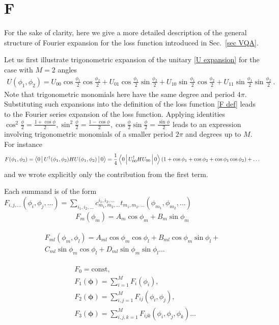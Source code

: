 \documentclass[twocolumn, amsfonts, amssymb, aps, nofootinbib]{revtex4-2}
\begin{document}
\onecolumngrid


\appendix
\section{F} \label{app explicit}
For the sake of clarity, here we give a more detailed description of the general structure of Fourier expansion for the loss function introduced in Sec.~\ref{sec VQA}.

Let us first illustrate trigonometric expansion of the unitary \eqref{U expansion} for the case with $M=2$ angles
\begin{align}
	U(\phi_1,\phi_2) = U_{00}\cos\frac{\phi_1}{2}\cos\frac{\phi_2}{2}+U_{01}\cos\frac{\phi_1}{2}\sin\frac{\phi_2}{2}+U_{10}\sin\frac{\phi_1}{2}\cos\frac{\phi_2}{2}+U_{11}\sin\frac{\phi_1}{2}\sin\frac{\phi_2}{2} \ . \label{U2}
\end{align}
Note that trigonometric monomials here have the same degree and period $4\pi$. Substituting such expansions into the definition of the loss function \eqref{F def} leads to the Fourier series expansion of the loss function. Applying identities $\cos^2\frac{\phi}{2}=\frac{1+\cos\phi}{2}, \sin^2\frac{\phi}{2}=\frac{1-\cos\phi}{2}, \cos\frac{\phi}{2}\sin\frac{\phi}{2}=\frac{\sin\phi}{2}$ leads to an expression involving trigonometric monomials of a smaller period $2\pi$ and degrees up to $M$. For instance 
\begin{align}
	F(\phi_1,\phi_2)=\Braket{0|U^\dagger(\phi_1,\phi_2)HU(\phi_1,\phi_2)|0}=\frac14\Braket{0|U_{00}^\dagger HU_{00}|0}\left(1+\cos\phi_1+\cos\phi_2+\cos\phi_1\cos\phi_2\right)+\dots
\end{align}
and we wrote explicitly only the contribution from the first term.


Each summand is of the form $F_{i,j,\dots}(\phi_i,\phi_j,\dots)=\sum_{i_1,i_2,\dots}c^{i_1,i_2,\dots}_{m_1,m_2,\dots}t_{m_1, m_2,\dots}(\phi_{m_1},\phi_{m_2},\dots)$
\begin{align}
F_m(\phi_m)=A_m\cos\phi_m+B_m\sin\phi_m
\end{align}

\begin{multline}
F_{ml}(\phi_m,\phi_l)=A_{ml}\cos\phi_m\cos\phi_l+B_{ml}\cos\phi_m\sin\phi_l+\\C_{ml}\sin\phi_m\cos\phi_l+D_{ml}\sin\phi_m\sin\phi_l\dots
\end{multline}

\begin{align}
\begin{split}
&F_0=\text{const},\\
&F_1(\pmb\phi)=\sum_{i=1}^M F_i(\phi_i),\\
&F_2(\pmb\phi)=\sum_{i,j=1}^M F_{ij}(\phi_i,\phi_j),\\
&F_3(\pmb\phi)=\sum_{i,j,k=1}^M F_{ijk}(\phi_i,\phi_j, \phi_k)\dots
\end{split}
\end{align}
\end{document}
